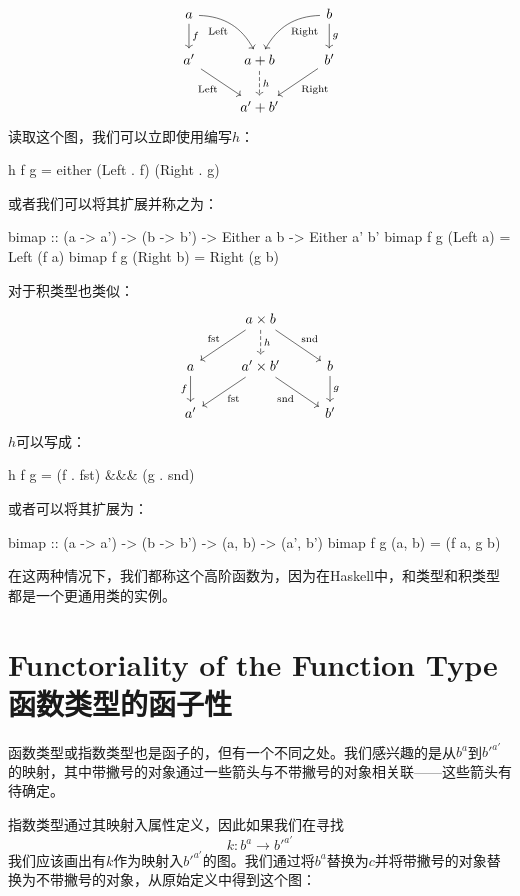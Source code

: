 \documentclass[DaoFP]{subfiles}
\begin{document}
\[
\begin{tikzcd}
a
\arrow[d, "f"]
\arrow[dr,  bend left, "\text{Left}"']
&& b
\arrow[d, "g"]
\arrow[dl, bend right, "\text{Right}"]
\\
a'
\arrow[rd, "\text{Left}"']
&a + b
\arrow[d, dashed, "h"]
& b'
\arrow[ld, "\text{Right}"]
\\
& a' + b'
\end{tikzcd}
\]
读取这个图，我们可以立即使用编写$h$：
\begin{haskell}
h f g = either (Left . f) (Right . g)
\end{haskell}
或者我们可以将其扩展并称之为：
\begin{haskell}
bimap :: (a -> a') -> (b -> b') -> Either a b -> Either a' b'
bimap f g (Left  a) = Left  (f a)
bimap f g (Right b) = Right (g b)
\end{haskell}
对于积类型也类似：
\[
\begin{tikzcd}
& a \times b
\arrow[d, dashed, "h"]
\arrow[dl,  "\text{fst}"']
\arrow[dr,   "\text{snd}"]
\\
a
\arrow[d, "f"']
&a' \times b'
\arrow[dl,  "\text{fst}"]
\arrow[dr,   "\text{snd}"']
& b
\arrow[d, "g"]
\\
a' && b'
\end{tikzcd}
\]
$h$可以写成：
\begin{haskell}
h f g = (f . fst) &&& (g . snd)
\end{haskell}
或者可以将其扩展为：
\begin{haskell}
bimap :: (a -> a') -> (b -> b') -> (a, b) -> (a', b')
bimap f g (a, b) = (f a, g b)
\end{haskell}
在这两种情况下，我们都称这个高阶函数为，因为在Haskell中，和类型和积类型都是一个更通用类的实例。

\section{Functoriality of the Function Type\\函数类型的函子性}

函数类型或指数类型也是函子的，但有一个不同之处。我们感兴趣的是从$b^a$到$b'^{a'}$的映射，其中带撇号的对象通过一些箭头与不带撇号的对象相关联——这些箭头有待确定。

指数类型通过其映射入属性定义，因此如果我们在寻找
\[k \colon b^a \to b'^{a'} \]
我们应该画出有$k$作为映射入$b'^{a'}$的图。我们通过将$b^a$替换为$c$并将带撇号的对象替换为不带撇号的对象，从原始定义中得到这个图：
\end{document}
